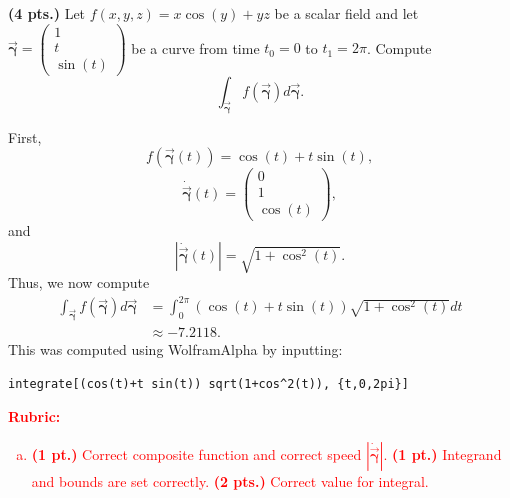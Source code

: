 \documentclass[12pt]{article} %
\newcommand{\curvegamma}{\boldsymbol{\vec{\gamma}}}
\newcommand{\tangentgamma}{\boldsymbol{\dot{\vec{\gamma}}}}
\begin{document}
\newpage
\begin{problem}
\textbf{(4 pts.)} Let $f(x,y,z)=x \cos(y) + yz$ be a scalar field and let $\curvegamma = \begin{pmatrix} 1 \\ t \\ \sin(t) \end{pmatrix}$ be a curve from time $t_0 = 0$ to $t_1 = 2 \pi$. Compute
\[
    \int_{\curvegamma} f(\curvegamma)d\curvegamma.
\]
\end{problem}
\begin{solution}
First,
\[
f(\curvegamma(t)) = \cos(t) + t \sin(t),
\]
\[
\tangentgamma(t) = \begin{pmatrix} 0 \\ 1 \\ \cos(t) \end{pmatrix},
\]
and
\[
\left| \tangentgamma(t) \right| = \sqrt{1+\cos^2(t)}.
\]
Thus, we now compute
\begin{align*}
    \int_{\curvegamma} f(\curvegamma)d\curvegamma & = \int_0^{2\pi} (\cos(t) + t \sin(t)) \sqrt{1+\cos^2(t)} dt\\
    &\approx -7.2118.
\end{align*}
This was computed using WolframAlpha by inputting:
\begin{verbatim}
integrate[(cos(t)+t sin(t)) sqrt(1+cos^2(t)), {t,0,2pi}]
\end{verbatim}
\end{solution}
\vspace*{1cm}
\textcolor{red}{
\noindent \textbf{Rubric:}
\begin{enumerate}[(a)]
    \item \textbf{(1 pt.)} Correct composite function and correct speed $|\tangentgamma|$. \textbf{(1 pt.)} Integrand and bounds are set correctly. \textbf{(2 pts.)} Correct value for integral.
\end{enumerate}
}
\end{document}
